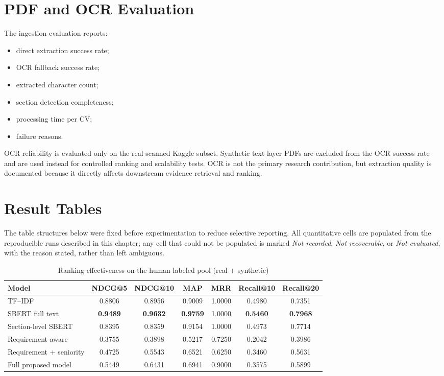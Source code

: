 \documentclass[12pt,a4paper,oneside]{report}
\begin{document}
\section{PDF and OCR Evaluation}
The ingestion evaluation reports:
\begin{itemize}
  \item direct extraction success rate;
  \item OCR fallback success rate;
  \item extracted character count;
  \item section detection completeness;
  \item processing time per CV;
  \item failure reasons.
\end{itemize}

OCR reliability is evaluated only on the real scanned Kaggle subset. Synthetic text-layer PDFs are excluded from the OCR success rate and are used instead for controlled ranking and scalability tests. OCR is not the primary research contribution, but extraction quality is documented because it directly affects downstream evidence retrieval and ranking.

\section{Result Tables}
The table structures below were fixed before experimentation to reduce selective reporting. All quantitative cells are populated from the reproducible runs described in this chapter; any cell that could not be populated is marked \emph{Not recorded}, \emph{Not recoverable}, or \emph{Not evaluated}, with the reason stated, rather than left ambiguous.

\begin{table}[htbp]
\centering
\caption{Ranking effectiveness on the human-labeled pool (real + synthetic)}
\label{tab:ranking-results}
\begin{adjustbox}{max width=\textwidth}
\begin{tabular}{lcccccc}
\toprule
Model & NDCG@5 & NDCG@10 & MAP & MRR & Recall@10 & Recall@20 \\
\midrule
TF--IDF & 0.8806 & 0.8956 & 0.9009 & 1.0000 & 0.4980 & 0.7351 \\
SBERT full text & \textbf{0.9489} & \textbf{0.9632} & \textbf{0.9759} & 1.0000 & \textbf{0.5460} & \textbf{0.7968} \\
Section-level SBERT & 0.8395 & 0.8359 & 0.9154 & 1.0000 & 0.4973 & 0.7714 \\
Requirement-aware & 0.3755 & 0.3898 & 0.5217 & 0.7250 & 0.2042 & 0.3986 \\
Requirement + seniority & 0.4725 & 0.5543 & 0.6521 & 0.6250 & 0.3460 & 0.5631 \\
Full proposed model & 0.5449 & 0.6431 & 0.6941 & 0.9000 & 0.3575 & 0.5899 \\
\bottomrule
\end{tabular}
\end{adjustbox}
\end{table}
\end{document}
